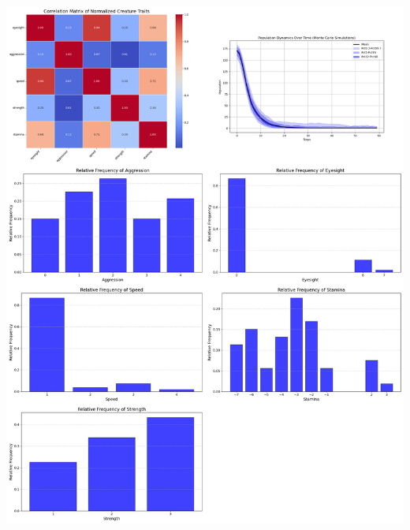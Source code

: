 \documentclass{article}
\begin{document}
\begin{center}
    \includegraphics[scale=0.21]{tests/2.3.jpg}
\end{center}
\end{document}
